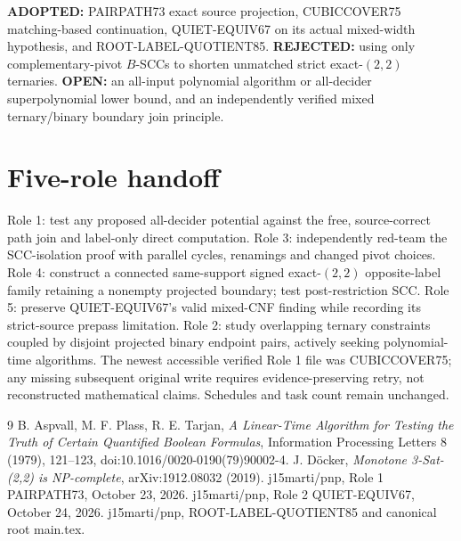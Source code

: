 \documentclass[11pt]{article}
\begin{document}
\noindent\textbf{ADOPTED:} PAIRPATH73 exact source projection, CUBICCOVER75 matching-based continuation, QUIET-EQUIV67 on its actual mixed-width hypothesis, and ROOT-LABEL-QUOTIENT85. \textbf{REJECTED:} using only complementary-pivot $B$-SCCs to shorten unmatched strict exact-$(2,2)$ ternaries. \textbf{OPEN:} an all-input polynomial algorithm or all-decider superpolynomial lower bound, and an independently verified mixed ternary/binary boundary join principle.

\section{Five-role handoff}
Role 1: test any proposed all-decider potential against the free, source-correct path join and label-only direct computation. Role 3: independently red-team the SCC-isolation proof with parallel cycles, renamings and changed pivot choices. Role 4: construct a connected same-support signed exact-$(2,2)$ opposite-label family retaining a nonempty projected boundary; test post-restriction SCC. Role 5: preserve QUIET-EQUIV67's valid mixed-CNF finding while recording its strict-source prepass limitation. Role 2: study overlapping ternary constraints coupled by disjoint projected binary endpoint pairs, actively seeking polynomial-time algorithms. The newest accessible verified Role 1 file was CUBICCOVER75; any missing subsequent original write requires evidence-preserving retry, not reconstructed mathematical claims. Schedules and task count remain unchanged.

\begin{thebibliography}{9}
 B. Aspvall, M. F. Plass, R. E. Tarjan, \emph{A Linear-Time Algorithm for Testing the Truth of Certain Quantified Boolean Formulas}, Information Processing Letters 8 (1979), 121--123, doi:10.1016/0020-0190(79)90002-4.
 J. D\"ocker, \emph{Monotone 3-Sat-(2,2) is NP-complete}, arXiv:1912.08032 (2019).
 j15marti/pnp, Role 1 PAIRPATH73, October 23, 2026.
 j15marti/pnp, Role 2 QUIET-EQUIV67, October 24, 2026.
 j15marti/pnp, ROOT-LABEL-QUOTIENT85 and canonical root main.tex.
\end{thebibliography}
\end{document}
